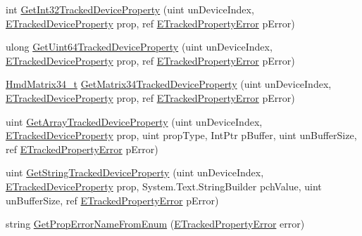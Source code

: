 \begin{DoxyCompactItemize}
\item 
int \mbox{\hyperlink{class_valve_1_1_v_r_1_1_c_v_r_system_abe82e7c658121c24812c9cfc444a750c}{Get\+Int32\+Tracked\+Device\+Property}} (uint un\+Device\+Index, \mbox{\hyperlink{namespace_valve_1_1_v_r_ab060521ead7273986988fc4897e52482}{E\+Tracked\+Device\+Property}} prop, ref \mbox{\hyperlink{namespace_valve_1_1_v_r_aab6684f03930a2d2cf22ed66b437e47b}{E\+Tracked\+Property\+Error}} p\+Error)
\item 
ulong \mbox{\hyperlink{class_valve_1_1_v_r_1_1_c_v_r_system_a2cde74d7011dc5d9f2727c29f3a9e8c1}{Get\+Uint64\+Tracked\+Device\+Property}} (uint un\+Device\+Index, \mbox{\hyperlink{namespace_valve_1_1_v_r_ab060521ead7273986988fc4897e52482}{E\+Tracked\+Device\+Property}} prop, ref \mbox{\hyperlink{namespace_valve_1_1_v_r_aab6684f03930a2d2cf22ed66b437e47b}{E\+Tracked\+Property\+Error}} p\+Error)
\item 
\mbox{\hyperlink{struct_valve_1_1_v_r_1_1_hmd_matrix34__t}{Hmd\+Matrix34\+\_\+t}} \mbox{\hyperlink{class_valve_1_1_v_r_1_1_c_v_r_system_af01c2051f20b88132e757879a4869e80}{Get\+Matrix34\+Tracked\+Device\+Property}} (uint un\+Device\+Index, \mbox{\hyperlink{namespace_valve_1_1_v_r_ab060521ead7273986988fc4897e52482}{E\+Tracked\+Device\+Property}} prop, ref \mbox{\hyperlink{namespace_valve_1_1_v_r_aab6684f03930a2d2cf22ed66b437e47b}{E\+Tracked\+Property\+Error}} p\+Error)
\item 
uint \mbox{\hyperlink{class_valve_1_1_v_r_1_1_c_v_r_system_abf54d8807c8b17fd968b0d46b405c56d}{Get\+Array\+Tracked\+Device\+Property}} (uint un\+Device\+Index, \mbox{\hyperlink{namespace_valve_1_1_v_r_ab060521ead7273986988fc4897e52482}{E\+Tracked\+Device\+Property}} prop, uint prop\+Type, Int\+Ptr p\+Buffer, uint un\+Buffer\+Size, ref \mbox{\hyperlink{namespace_valve_1_1_v_r_aab6684f03930a2d2cf22ed66b437e47b}{E\+Tracked\+Property\+Error}} p\+Error)
\item 
uint \mbox{\hyperlink{class_valve_1_1_v_r_1_1_c_v_r_system_a7832bc9cd34345dacb66731bc39d8f2a}{Get\+String\+Tracked\+Device\+Property}} (uint un\+Device\+Index, \mbox{\hyperlink{namespace_valve_1_1_v_r_ab060521ead7273986988fc4897e52482}{E\+Tracked\+Device\+Property}} prop, System.\+Text.\+String\+Builder pch\+Value, uint un\+Buffer\+Size, ref \mbox{\hyperlink{namespace_valve_1_1_v_r_aab6684f03930a2d2cf22ed66b437e47b}{E\+Tracked\+Property\+Error}} p\+Error)
\item 
string \mbox{\hyperlink{class_valve_1_1_v_r_1_1_c_v_r_system_a416e8b65c6d1c54c84196346a17c9e90}{Get\+Prop\+Error\+Name\+From\+Enum}} (\mbox{\hyperlink{namespace_valve_1_1_v_r_aab6684f03930a2d2cf22ed66b437e47b}{E\+Tracked\+Property\+Error}} error)

\end{DoxyCompactItemize}
